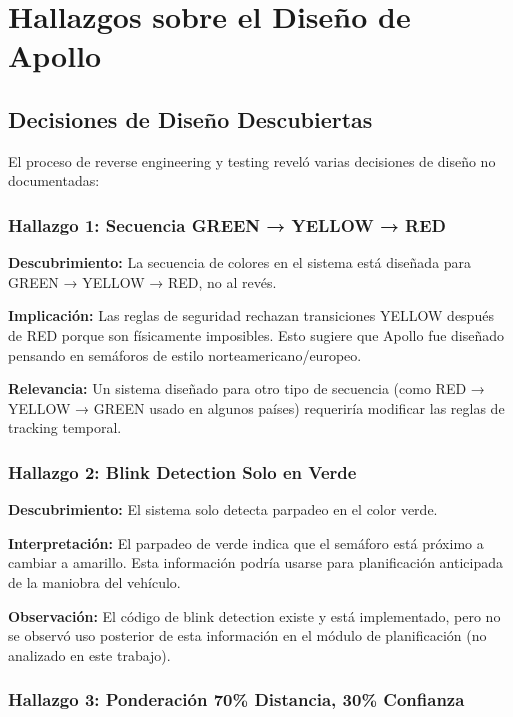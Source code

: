 \section{Hallazgos sobre el Diseño de Apollo}

\subsection{Decisiones de Diseño Descubiertas}

El proceso de reverse engineering y testing reveló varias decisiones de diseño no documentadas:

\subsubsection{Hallazgo 1: Secuencia GREEN → YELLOW → RED}

\textbf{Descubrimiento:} La secuencia de colores en el sistema está diseñada para GREEN → YELLOW → RED, no al revés.

\textbf{Implicación:} Las reglas de seguridad rechazan transiciones YELLOW después de RED porque son físicamente imposibles. Esto sugiere que Apollo fue diseñado pensando en semáforos de estilo norteamericano/europeo.

\textbf{Relevancia:} Un sistema diseñado para otro tipo de secuencia (como RED → YELLOW → GREEN usado en algunos países) requeriría modificar las reglas de tracking temporal.

\subsubsection{Hallazgo 2: Blink Detection Solo en Verde}

\textbf{Descubrimiento:} El sistema solo detecta parpadeo en el color verde.

\textbf{Interpretación:} El parpadeo de verde indica que el semáforo está próximo a cambiar a amarillo. Esta información podría usarse para planificación anticipada de la maniobra del vehículo.

\textbf{Observación:} El código de blink detection existe y está implementado, pero no se observó uso posterior de esta información en el módulo de planificación (no analizado en este trabajo).

\subsubsection{Hallazgo 3: Ponderación 70\% Distancia, 30\% Confianza}

